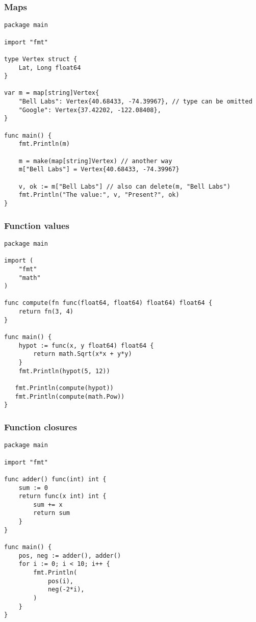 \begin{frame}[fragile]
\frametitle{Maps}

\begin{lstlisting}
package main

import "fmt"

type Vertex struct {
    Lat, Long float64
}

var m = map[string]Vertex{
    "Bell Labs": Vertex{40.68433, -74.39967}, // type can be omitted
    "Google": Vertex{37.42202, -122.08408},
}

func main() {
    fmt.Println(m)
    
    m = make(map[string]Vertex) // another way
    m["Bell Labs"] = Vertex{40.68433, -74.39967}
    
    v, ok := m["Bell Labs"] // also can delete(m, "Bell Labs")
    fmt.Println("The value:", v, "Present?", ok)
}
\end{lstlisting}
\end{frame}


\begin{frame}[fragile]
\frametitle{Function values}

\begin{lstlisting}
package main

import (
    "fmt"
    "math"
)

func compute(fn func(float64, float64) float64) float64 {
    return fn(3, 4)
}

func main() {
    hypot := func(x, y float64) float64 {
        return math.Sqrt(x*x + y*y)
    }
    fmt.Println(hypot(5, 12))

   fmt.Println(compute(hypot))
   fmt.Println(compute(math.Pow))
}
\end{lstlisting}
\end{frame}


\begin{frame}[fragile]
\frametitle{Function closures}

\begin{lstlisting}
package main

import "fmt"

func adder() func(int) int {
    sum := 0
    return func(x int) int {
        sum += x
        return sum
    }
}

func main() {
    pos, neg := adder(), adder()
    for i := 0; i < 10; i++ {
        fmt.Println(
            pos(i),
            neg(-2*i),
        )
    }
}
\end{lstlisting}
\end{frame}